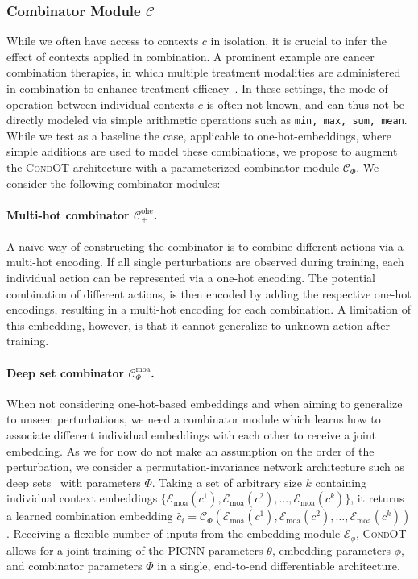 \subsubsection{Combinator Module $\mathcal{C}$}
 While we often have access to contexts $c$ in isolation, it is crucial to infer the effect of contexts applied in combination. A prominent example are cancer combination therapies, in which multiple treatment modalities are administered in combination to enhance treatment efficacy~\citep{kummar2010utilizing}.
In these settings, the mode of operation between individual contexts $c$ is often not known, and can thus not be directly modeled via simple arithmetic operations such as 
\texttt{min, max, sum, mean}.
While we test as a baseline the case, applicable to one-hot-embeddings, where simple additions are used to model these combinations, we propose to augment the \textsc{CondOT} architecture with a parameterized combinator module $\mathcal{C}_\Phi$. We consider the following combinator modules:

\paragraph{Multi-hot combinator $\mathcal{C}^\text{ohe}_+$.}
A na\"ive way of constructing the combinator is to combine different actions via a multi-hot encoding. If all single perturbations are observed during training, each individual action can be represented via a one-hot encoding. The potential combination of different actions, is then encoded by adding the respective one-hot encodings, resulting in a multi-hot encoding for each combination.
A limitation of this embedding, however, is that it cannot generalize to unknown action after training.

\paragraph{Deep set combinator $\mathcal{C}^\text{moa}_\Phi$.}
When not considering one-hot-based embeddings and when aiming to generalize to unseen perturbations, we need a combinator module which learns how to associate different individual embeddings with each other to receive a joint embedding.
As we for now do not make an assumption on the order of the perturbation, we consider a permutation-invariance network architecture such as deep sets~\citep{zaheer2017deep} with parameters $\Phi$. Taking a set of arbitrary size $k$ containing individual context embeddings $\{\mathcal{E}_\text{moa}(c^1), \mathcal{E}_\text{moa}(c^2), \dots, \mathcal{E}_\text{moa}(c^k)\}$, it returns a learned combination embedding $\hat{c}_i = \mathcal{C}_\Phi(\mathcal{E}_\text{moa}(c^1), \mathcal{E}_\text{moa}(c^2), \dots, \mathcal{E}_\text{moa}(c^k))$.
Receiving a flexible number of inputs from the embedding module $\mathcal{E}_\phi$, \textsc{CondOT} allows for a joint training of the PICNN parameters $\theta$, embedding parameters $\phi$, and combinator parameters $\Phi$ in a single, end-to-end differentiable architecture.


